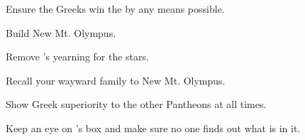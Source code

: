 \documentclass[char]{guardians}
\begin{document}
\begin{itemz}[Goals]
  \item Ensure the Greeks win the \pGames{} by any means possible.
  \item Build New Mt. Olympus.
  \item Remove \cAthena{}'s yearning for the stars.
  \item Recall your wayward family to New Mt. Olympus.
  \item Show Greek superiority to the other Pantheons at all times.
  \item Keep an eye on \cPandora{}'s box and make sure no one finds out what is in it.
\end{itemz}


\begin{contacts}
  \contact{}
\end{contacts}
\end{document}
